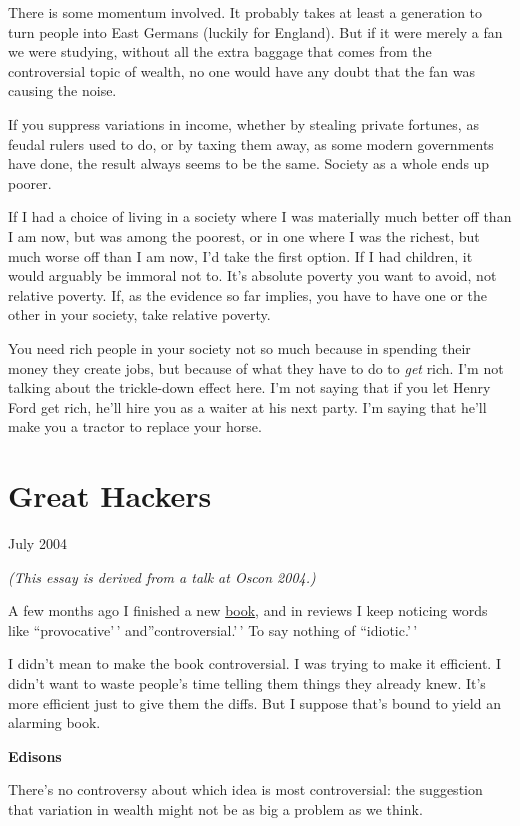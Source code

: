 \documentclass[12pt]{book}
\begin{document}
There is some momentum involved. It probably takes at least a generation
to turn people into East Germans (luckily for England). But if it were
merely a fan we were studying, without all the extra baggage that comes
from the controversial topic of wealth, no one would have any doubt that
the fan was causing the noise.

If you suppress variations in income, whether by stealing private
fortunes, as feudal rulers used to do, or by taxing them away, as some
modern governments have done, the result always seems to be the same.
Society as a whole ends up poorer.

If I had a choice of living in a society where I was materially much
better off than I am now, but was among the poorest, or in one where I
was the richest, but much worse off than I am now, I'd take the first
option. If I had children, it would arguably be immoral not to. It's
absolute poverty you want to avoid, not relative poverty. If, as the
evidence so far implies, you have to have one or the other in your
society, take relative poverty.

You need rich people in your society not so much because in spending
their money they create jobs, but because of what they have to do to
\emph{get} rich. I'm not talking about the trickle-down effect here. I'm
not saying that if you let Henry Ford get rich, he'll hire you as a
waiter at his next party. I'm saying that he'll make you a tractor to
replace your horse.
\chapter{Great Hackers}

July 2004

\emph{(This essay is derived from a talk at Oscon 2004.)}

A few months ago I finished a new
\href{http://www.amazon.com/exec/obidos/tg/detail/-/0596006624}{book},
and in reviews I keep noticing words like ``provocative'\,'
and''controversial.'\,' To say nothing of ``idiotic.'\,'

I didn't mean to make the book controversial. I was trying to make it
efficient. I didn't want to waste people's time telling them things they
already knew. It's more efficient just to give them the diffs. But I
suppose that's bound to yield an alarming book.

\textbf{Edisons}

There's no controversy about which idea is most controversial: the
suggestion that variation in wealth might not be as big a problem as we
think.
\end{document}
